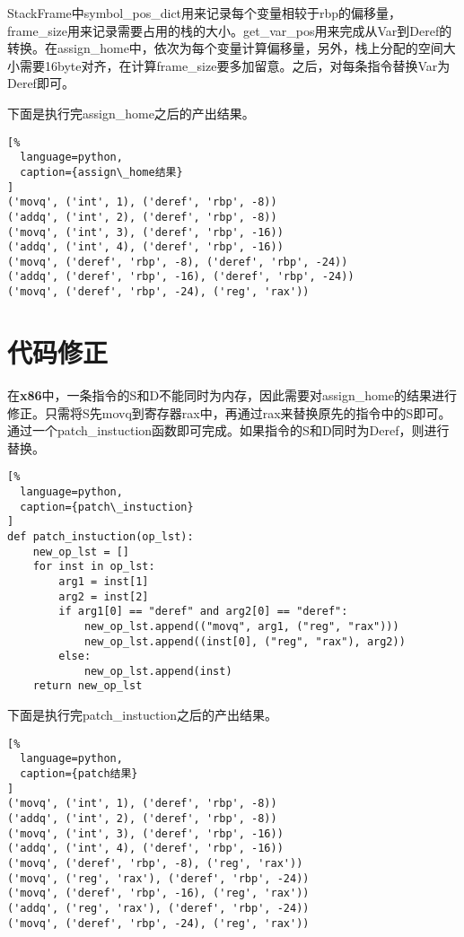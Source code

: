 StackFrame中symbol\_pos\_dict用来记录每个变量相较于rbp的偏移量，frame\_size用来记录需要占用的栈的大小。get\_var\_pos用来完成从Var到Deref的转换。在assign\_home中，依次为每个变量计算偏移量，另外，栈上分配的空间大小需要16byte对齐，在计算frame\_size要多加留意。之后，对每条指令替换Var为Deref即可。

下面是执行完assign\_home之后的产出结果。

\begin{lstlisting}[%
  language=python,
  caption={assign\_home结果}
]
('movq', ('int', 1), ('deref', 'rbp', -8))
('addq', ('int', 2), ('deref', 'rbp', -8))
('movq', ('int', 3), ('deref', 'rbp', -16))
('addq', ('int', 4), ('deref', 'rbp', -16))
('movq', ('deref', 'rbp', -8), ('deref', 'rbp', -24))
('addq', ('deref', 'rbp', -16), ('deref', 'rbp', -24))
('movq', ('deref', 'rbp', -24), ('reg', 'rax'))
\end{lstlisting}



\section{代码修正}

在\textbf{x86}中，一条指令的S和D不能同时为内存，因此需要对assign\_home的结果进行修正。只需将S先movq到寄存器rax中，再通过rax来替换原先的指令中的S即可。通过一个patch\_instuction函数即可完成。如果指令的S和D同时为Deref，则进行替换。

\begin{lstlisting}[%
  language=python,
  caption={patch\_instuction}
]
def patch_instuction(op_lst):
    new_op_lst = []
    for inst in op_lst:
        arg1 = inst[1]
        arg2 = inst[2]
        if arg1[0] == "deref" and arg2[0] == "deref":
            new_op_lst.append(("movq", arg1, ("reg", "rax")))
            new_op_lst.append((inst[0], ("reg", "rax"), arg2))
        else:
            new_op_lst.append(inst)
    return new_op_lst
\end{lstlisting}

下面是执行完patch\_instuction之后的产出结果。

\begin{lstlisting}[%
  language=python,
  caption={patch结果}
]
('movq', ('int', 1), ('deref', 'rbp', -8))
('addq', ('int', 2), ('deref', 'rbp', -8))
('movq', ('int', 3), ('deref', 'rbp', -16))
('addq', ('int', 4), ('deref', 'rbp', -16))
('movq', ('deref', 'rbp', -8), ('reg', 'rax'))
('movq', ('reg', 'rax'), ('deref', 'rbp', -24))
('movq', ('deref', 'rbp', -16), ('reg', 'rax'))
('addq', ('reg', 'rax'), ('deref', 'rbp', -24))
('movq', ('deref', 'rbp', -24), ('reg', 'rax'))
\end{lstlisting}

